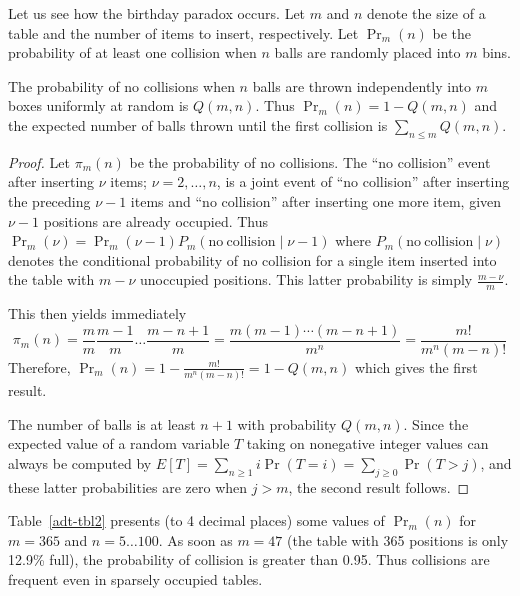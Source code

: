 Let us see how the birthday paradox occurs. Let \(m\) and \(n\) denote the 
size of a table and the number of items to insert, respectively. 
Let $\Pr_{m}(n)$ be the probability of at least one collision when 
$n$ balls are randomly placed into  $m$ bins.

\begin{Lemma}
The probability of no collisions when $n$ balls are thrown independently 
into $m$ boxes uniformly at random is $Q(m, n)$. Thus 
${\Pr_m}(n) =  1 - Q(m,n)$
and the expected number of balls thrown until the first collision is 
$\sum_{n\leq m} Q(m,n)$. 
\end{Lemma}

\begin{proof} Let $\pi_{m}(n)$ be the probability of no collisions.
 The ``no collision'' event after
inserting \(\nu\) items; \(\nu=2,\ldots,n\), is a joint event of
``no collision'' after inserting the preceding \(\nu-1\) items and 
``no collision'' after inserting one more item, given \(\nu-1\)
positions are already occupied. Thus 
\(\Pr_m(\nu)=\Pr_m(\nu-1)P_{m}(\mathrm{no~collision} \mid \nu-1)\)
where \(P_{m}(\mathrm{no~collision} \mid \nu)\) denotes the conditional
probability of no collision for a single item inserted into the
table with \(m-\nu\) unoccupied positions. This latter
probability is simply \(\frac{m-\nu}{m}\).

This then yields immediately
\[
\pi_{m}(n) = \frac{m}{m}\frac{m-1}{m} \dots \frac{m-n+1}{m} = 
\frac{m(m-1)\cdots(m-n+1)}{m^{n}} =  \frac{m!}{m^{n}(m-n)!}
\]
Therefore,
\(
\Pr_{m}(n) = 1 - \frac{m!}{m^{n}(m-n)!} = 1 - Q(m,n)
\)
which gives the first result.

The number of balls is at least $n+1$ with probability $Q(m,n)$. Since the 
expected value of a random variable $T$ taking on nonegative integer values 
 can always be computed by $E[T] = \sum_{n\geq 1} i \Pr(T=i) = 
 \sum_{j\geq 0} \Pr(T>j)$, and these latter probabilities are zero when $j>m$,
 the second result follows.
\end{proof}

Table~\ref{adt-tbl2} presents (to 4 decimal places)
some values of \(\Pr_{m}(n)\) for \(m=365\) and \(n=5\ldots100\). 
As soon as $m=47$ (the table with 365 positions is only 12.9\% full),
the probability of collision is greater than 0.95.
Thus collisions are frequent even in sparsely occupied tables.

